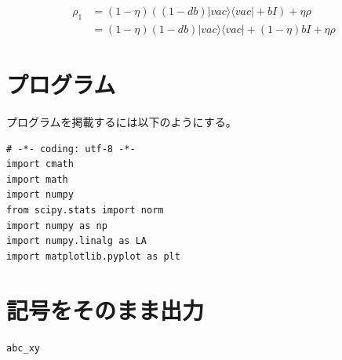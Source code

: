 \begin{equation}
\begin{split}
\rho_1&=(1−\eta)((1−db)|vac\rangle\langle vac|+bI)+\eta\rho\\
&=(1−\eta)(1−db)|vac\rangle\langle vac|+(1-\eta)bI+\eta\rho
\end{split} \label{sample_rho_1}
\end{equation}

\section{プログラム}
プログラムを掲載するには以下のようにする。

\begin{lstlisting}[caption=hoge,label=fuga]
# -*- coding: utf-8 -*-
import cmath
import math
import numpy
from scipy.stats import norm
import numpy as np
import numpy.linalg as LA
import matplotlib.pyplot as plt
\end{lstlisting}

\section{記号をそのまま出力}

\verb|abc_xy|
